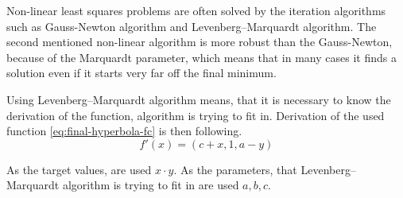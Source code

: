 Non-linear least squares problems are often solved by the iteration algorithms 
such as Gauss-Newton algorithm\cite{gratton2007approximate} and Levenberg–Marquardt algorithm\cite{marquardt1963algorithm}.
The second mentioned non-linear algorithm is more robust than the Gauss-Newton, 
because of the Marquardt parameter\cite{marquardt1963algorithm},
which means that in many cases it finds a solution even if it starts very far off the final minimum.

Using Levenberg–Marquardt algorithm means, 
that it is necessary to know the derivation of the function, 
algorithm is trying to fit in.
Derivation of the used function \ref{eq:final-hyperbola-fc} is then following.
\begin{equation}\label{eq:final-hyperbola-fd}
    f'(x) = (c+x, 1, a-y)
\end{equation}

As the target values, are used $x \cdot y$.
As the parameters, that Levenberg–Marquardt algorithm is trying to fit in are used $a,b,c$.
